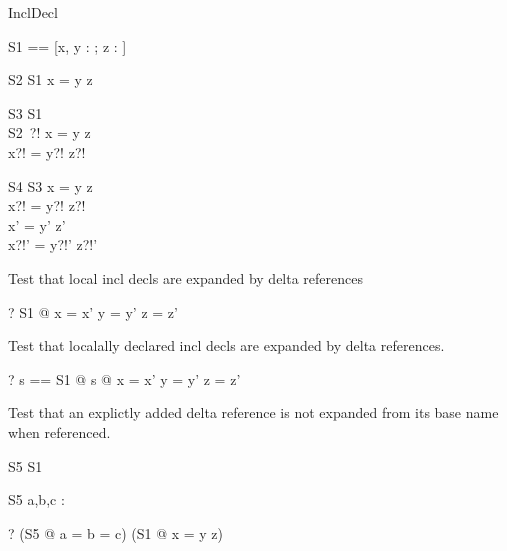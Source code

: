 \begin{zsection}
  \SECTION InclDecl
\end{zsection}

\begin{zed}
  S1 == [x, y : \nat; z : \power \nat]
\end{zed}

\begin{schema}{S2}
  S1
\where
  x = y \in z
\end{schema} 

\begin{schema}{S3}
  S1\\
  S2~?!
\where
  x = y \in z\\
  x?! = y?! \in z?!
\end{schema}

\begin{schema}{S4}
  \Delta S3
\where
  x = y \in z\\
  x?! = y?! \in z?!\\
  x' = y' \in z'\\
  x?!' = y?!' \in z?!'
\end{schema}

Test that local incl decls are expanded by delta references

\begin{zed}
 \vdash? \forall \Xi S1 @ x = x' \land y = y' \land z = z'
\end{zed}

Test that localally declared incl decls are expanded by delta 
references.

\begin{zed}
\vdash?
 \exists s == S1 @ \forall \Delta s @ x = x' \land y = y' \land z = z'
\end{zed}

Test that an explictly added delta reference is not expanded from its 
base name when referenced.

\begin{schema}{S5}
 S1
\end{schema}

\begin{schema}{\Delta S5}
 a,b,c : \nat
\end{schema}

\begin{zed}
 \vdash? (\exists \Delta S5 @ a = b = c) \land
         (\exists \Xi S1 @ x = y \in z)
\end{zed}
